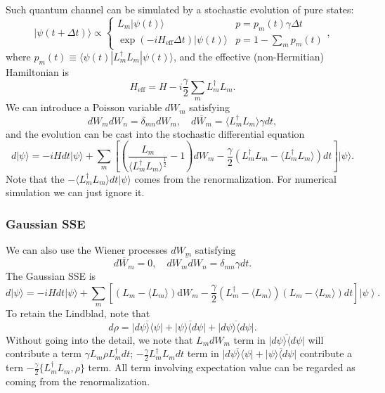 \documentclass[aps,prb,superscriptaddress,nofootinbib]{revtex4}
\begin{document}
Such quantum channel can be simulated by a stochastic evolution of pure states:
\begin{equation}
	|\psi(t+\Delta t)\rangle \propto \begin{cases}
		L_m |\psi(t)\rangle & p = p_m(t) \gamma\Delta t \\
		\exp(-iH_{\mathrm{eff}}\Delta t)|\psi(t)\rangle & p = 1-\sum_m p_m(t)
	\end{cases},
\end{equation}
where $p_m(t)\equiv \langle\psi(t)|L_m^\dagger L_m|\psi(t)\rangle$, and the effective (non-Hermitian) Hamiltonian is
\begin{equation}
	H_{\mathrm{eff}} = H -i\frac{\gamma}{2}\sum_m L_m^\dagger L_m.
\end{equation}
We can introduce a Poisson variable $dW_m$ satisfying
\begin{equation}
	dW_m dW_n = \delta_{mn} dW_m,\quad
	\overline{dW_m} = \langle L_m^\dagger L_m\rangle\gamma dt,
\end{equation}
and the evolution can be cast into the stochastic differential equation
\begin{equation}\label{eq:OS-SSE-Poisson}
	d|\psi\rangle = -iHdt |\psi\rangle + \sum_m \left[\left(\frac{L_m}{\langle L_m^\dagger L_m\rangle^{\frac{1}{2}}}-1\right)dW_m -\frac{\gamma}{2} \left(L_m^\dagger L_m-\langle L_m^\dagger L_m\rangle\right)dt \right]
	  |\psi\rangle.
\end{equation}
Note that the $-\langle L_m^\dagger L_m\rangle dt |\psi\rangle$ comes from the renormalization.
For numerical simulation we can just ignore it.



\subsubsection{Gaussian SSE}

We can also use the Wiener processes $dW_m$ satisfying 
\begin{equation}
	\overline{dW_m} = 0,\quad
	\overline{dW_m dW_n} = \delta_{mn} \gamma dt.
\end{equation}
The Gaussian SSE is
\begin{equation}
	d |\psi\rangle = -i H dt |\psi\rangle + 
	\sum_m \left[\left(L_m-\langle L_m\rangle\right) \mathrm{d} W_{m}-\frac{\gamma}{2}\left(L_m^\dagger-\langle L_m\rangle\right)\left(L_m-\langle L_m\rangle\right) dt\right]\left|\psi\right\rangle.
\end{equation}
To retain the Lindblad, note that
\begin{equation}
	d\rho = \overline{|d\psi\rangle\langle\psi|} + \overline{|\psi\rangle \langle d\psi|}+ \overline{|d\psi\rangle\langle d\psi|}.
\end{equation}
Without going into the detail, we note that $L_m dW_m$ term in $\overline{|d\psi\rangle\langle d\psi|}$ will contribute a term $\gamma L_m \rho L_m^\dagger dt$; $-\frac{\gamma}{2}L_m^\dagger L_m dt$ term in $\overline{|d\psi\rangle\langle\psi|} + \overline{|\psi\rangle \langle d\psi|}$ contribute a tern $-\frac{\gamma}{2}\{L_m^\dagger L_m, \rho\}$ term.
All term involving expectation value can be regarded as coming from the renormalization.
\end{document}
